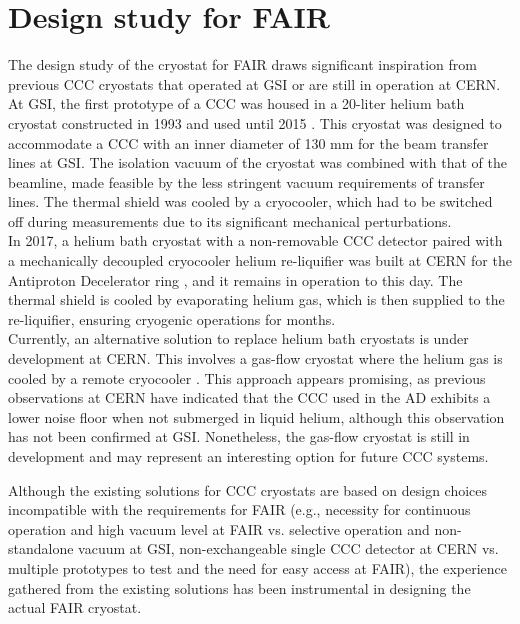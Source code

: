 \documentclass[12pt,a4paper]{report}
\begin{document}
       	\section{Design study for FAIR}
       The design study of the cryostat for FAIR draws significant inspiration from previous CCC cryostats that operated at GSI or are still in operation at CERN. At GSI, the first prototype of a CCC was housed in a 20-liter helium bath cryostat constructed in 1993 \cite{Schroeder1993} and used until 2015 \cite{KurianTh}. This cryostat was designed to accommodate a CCC with an inner diameter of 130 mm for the beam transfer lines at GSI. The isolation vacuum of the cryostat was combined with that of the beamline, made feasible by the less stringent vacuum requirements of transfer lines. The thermal shield was cooled by a cryocooler, which had to be switched off during measurements due to its significant mechanical perturbations. \\
       In 2017, a helium bath cryostat with a non-removable CCC detector paired with a mechanically decoupled cryocooler helium re-liquifier was built at CERN for the Antiproton Decelerator ring \cite{CERN_cryostat} \cite{CERN_cryostat_2}, and it remains in operation to this day. The thermal shield is cooled by evaporating helium gas, which is then supplied to the re-liquifier, ensuring cryogenic operations for months.\\
       Currently, an alternative solution to replace helium bath cryostats is under development at CERN. This involves a gas-flow cryostat where the helium gas is cooled by a remote cryocooler \cite{GAS_cryostat}. This approach appears promising, as previous observations at CERN have indicated that the CCC used in the AD exhibits a lower noise floor when not submerged in liquid helium, although this observation has not been confirmed at GSI. Nonetheless, the gas-flow cryostat is still in development and may represent an interesting option for future CCC systems.
       
       Although the existing solutions for CCC cryostats are based on design choices incompatible with the requirements for FAIR (e.g., necessity for continuous operation and high vacuum level at FAIR vs. selective operation and non-standalone vacuum at GSI, non-exchangeable single CCC detector at CERN vs. multiple prototypes to test and the need for easy access at FAIR), the experience gathered from the existing solutions has been instrumental in designing the actual FAIR cryostat.
       
\end{document}
